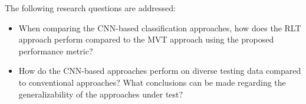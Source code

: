 
The following research questions are addressed: 
\begin{itemize}
    \item When comparing the CNN-based classification approaches, how does the RLT approach perform compared to the MVT 
    approach using the proposed performance metric? 

    \item How do the CNN-based approaches perform on diverse testing data compared to conventional approaches?
    What conclusions can be made regarding the generalizability of the approaches under test?
    
\end{itemize}

